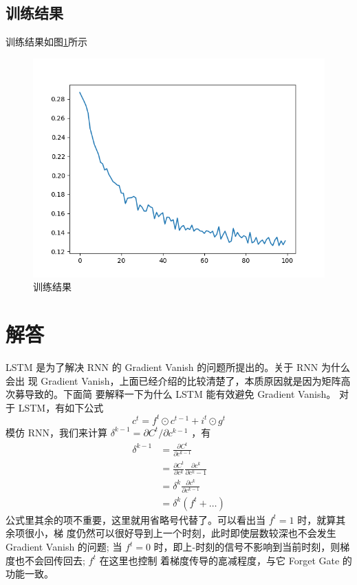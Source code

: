 \documentclass[UTF8,a4paper,10pt]{ctexart}
\begin{document}
\subsection{训练结果}

训练结果如图\ref{fig:1}所示
\begin{figure}[H]
    \centering
    \includegraphics[scale=0.5]{myplot.png}
    \caption{训练结果}
    \label{fig:1}
\end{figure}

\section{解答}

LSTM 是为了解决 RNN 的 Gradient Vanish 的问题所提出的。关于 RNN 为什么会出 现 Gradient Vanish，上面已经介绍的比较清楚了，本质原因就是因为矩阵高次募导致的。下面简 要解释一下为什么 LSTM 能有效避免 Gradient Vanish。
对于 LSTM，有如下公式
$$
c^{t}=f^{t} \odot c^{t-1}+i^{t} \odot g^{t}
$$
模仿 RNN，我们来计算 $\delta^{k-1}=\partial C^{t} / \partial c^{k-1}$ ，有
$$
\begin{aligned}
\delta^{k-1} &=\frac{\partial C^{t}}{\partial c^{k-1}} \\
&=\frac{\partial C^{t}}{\partial c^{k}} \frac{\partial c^{k}}{\partial c^{k}-1} \\
&=\delta^{k} \frac{\partial c^{k}}{\partial c^{k-1}} \\
&=\delta^{k}\left(f^{t}+\ldots\right)
\end{aligned}
$$
公式里其余的项不重要，这里就用省略号代替了。可以看出当 $f^{t}=1$ 时，就算其余项很小，梯 度仍然可以很好导到上一个时刻，此时即使层数较深也不会发生 Gradient Vanish 的问题; 当 $f^{t}=0$ 时，即上-时刻的信号不影响到当前时刻，则梯度也不会回传回去; $f^{t}$ 在这里也控制 着梯度传导的㖜减程度，与它 Forget Gate 的功能一致。


\end{document}
